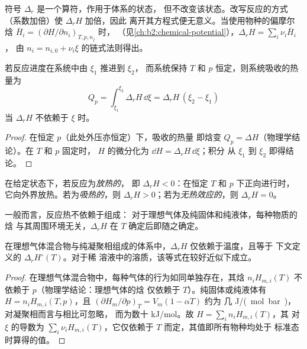 \begin{remark}[导数，而非差值]\label{rem:b2:reaction-enthalpy:operator}
符号 $\Delta_r$ 是一个算符，作用于体系的状态，
但不改变该状态。改写反应的方式
（系数加倍）使 $\Delta_r H$ 加倍，因此
离开其方程式便无意义。当使用物种的偏摩尔焓
$\bar H_i = (\partial H/\partial n_i)_{T,p,n_j}$ 时，
（见\cref{ch:b2:chemical-potential}），$\Delta_r H = \sum_i\nu_i\bar H_i$，
由 $n_i = n_{i,0} + \nu_i\xi$ 的链式法则得出。
\end{remark}

\begin{proposition}[定温定压下吸收的热量]\label{prop:b2:reaction-enthalpy:qp}
若反应进度在系统中由 $\xi_1$ 推进到 $\xi_2$，
而系统保持 $T$ 和 $p$ 恒定，则系统吸收的热量为
\[
  Q_p = \int_{\xi_1}^{\xi_2}\Delta_r H\,\dd\xi = \Delta_r H\,(\xi_2 - \xi_1)
\]
当 $\Delta_r H$ 不依赖于 $\xi$ 时。
\end{proposition}

\begin{proof}
在恒定 $p$（此处外压亦恒定）下，吸收的热量
即焓变 $Q_p = \Delta H$（物理学结论）。在 $T$ 和 $p$ 固定时，
$H$ 的微分化为 $\dd H = \Delta_r H\,\dd\xi$；积分
从 $\xi_1$ 到 $\xi_2$ 即得结论。
\end{proof}

\begin{definition}\label{def:b2:reaction-enthalpy:exothermic}
在给定状态下，若反应为\emph{放热的}，
即 $\Delta_r H < 0$：在恒定 $T$ 和 $p$ 下正向进行时，
它向外界放热。若为\emph{吸热的}，则 $\Delta_r H >
0$；若为\emph{无热效应的}，则 $\Delta_r H = 0$。
\end{definition}

一般而言，反应热不依赖于组成：
对于理想气体及纯固体和纯液体，每种物质的焓
与其周围环境无关，$\Delta_r H$ 在
$T$ 确定后即随之确定。

\begin{proposition}[理想系统]\label{prop:b2:reaction-enthalpy:ideal}
在理想气体混合物与纯凝聚相组成的体系中，$\Delta_r H$
仅依赖于温度，且等于
下文定义的 $\Delta_r H^\circ(T)$。对于稀
溶液中的溶质，该等式在较好近似下成立。
\end{proposition}

\begin{proof}
在理想气体混合物中，每种气体的行为如同单独存在，其焓
$n_iH_{m,i}(T)$ 不依赖于 $p$（物理学结论：理想气体的焓
仅依赖于 $T$）。纯固体或纯液体有 $H = n_iH_{m,i}(T,
p)$，且 $(\partial H_m/\partial p)_T = V_m(1 - \alpha T)$ 约为
几 \unit{J/(mol.bar)}，对凝聚相而言与相比可忽略，
而为数十 \unit{kJ/mol}。故 $H = \sum_in_iH_{m,i}(T)$，其
对 $\xi$ 的导数为 $\sum_i\nu_iH_{m,i}(T)$，它仅依赖于
$T$ 而定，其值即所有物种均处于
标准态时算得的值。
\end{proof}

